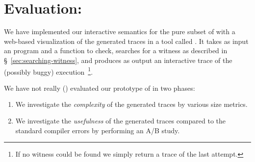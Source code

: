 \section{Evaluation: \nanomaly}
\label{sec:evaluation-nanomaly}
We have implemented our interactive semantics for the pure subset of
\ocaml with a web-based visualization of the generated traces in a tool
called \nanomaly.
%
It takes as input an \ocaml program and a function to check, searches
for a witness as described in \S~\ref{sec:searching-witness}, and
produces as output an interactive trace of the (possibly buggy)
execution~\footnote{If no witness could be found we simply return a trace
  of the last attempt.}.

We have not really () evaluated our prototype of \nanomaly in two phases:
%
\begin{enumerate}
\item We investigate the \emph{complexity} of the generated traces by various size metrics.
\item We investigate the \emph{usefulness} of the generated traces compared to the standard compiler errors by performing an A/B study.
\end{enumerate}

